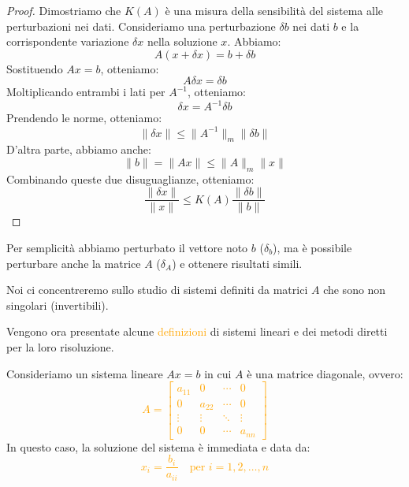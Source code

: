 \begin{proof}
    Dimostriamo che $K(A)$ è una misura della sensibilità del sistema alle perturbazioni nei dati. Consideriamo una perturbazione $\delta b$ nei dati $b$ e la corrispondente variazione $\delta x$ nella soluzione $x$. Abbiamo:
    \[
    A(x + \delta x) = b + \delta b
    \]
    Sostituendo $Ax = b$, otteniamo:
    \[
    A\delta x = \delta b
    \]
    Moltiplicando entrambi i lati per $A^{-1}$, otteniamo:
    \[
    \delta x = A^{-1} \delta b
    \]
    Prendendo le norme, otteniamo:
    \[
    \|\delta x\| \leq \|A^{-1}\|_m \|\delta b\|
    \]
    D'altra parte, abbiamo anche:
    \[
    \|b\| = \|Ax\| \leq \|A\|_m \|x\|
    \]
    Combinando queste due disuguaglianze, otteniamo:
    \[
    \frac{\|\delta x\|}{\|x\|} \leq K(A) \frac{\|\delta b\|}{\|b\|}
    \]
\end{proof}

\begin{obs}
    Per semplicità abbiamo perturbato il vettore noto $b$ ($\delta_b$), ma è possibile perturbare anche la matrice 
    $A$ ($\delta_A$) e ottenere risultati simili.
\end{obs}


Noi ci concentreremo sullo studio di sistemi definiti da matrici $A$ che sono non singolari (invertibili).

Vengono ora presentate alcune \textcolor{orange}{definizioni} di sistemi lineari e dei metodi diretti per la loro risoluzione.

\begin{defi}
Consideriamo un sistema lineare $Ax = b$ in cui $A$ è una matrice diagonale, ovvero:
\textcolor{orange}{\[
A = \begin{bmatrix}
a_{11} & 0 & \cdots & 0 \\
0 & a_{22} & \cdots & 0 \\
\vdots & \vdots & \ddots & \vdots \\
0 & 0 & \cdots & a_{nn}
\end{bmatrix}
\]}
In questo caso, la soluzione del sistema è immediata e data da:
\textcolor{orange}{\[
x_i = \frac{b_i}{a_{ii}} \quad \text{per } i = 1, 2, \ldots, n
\]}
\end{defi}

